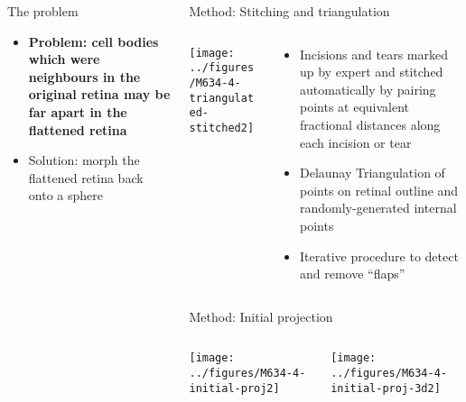 \documentclass[final,hyperref={pdfpagelabels=false}]{beamer}
\begin{document}
\begin{frame}{}
\begin{columns}[T]
\begin{column}{.33\linewidth}
\begin{block}{The problem}
        \begin{itemize}
        \item \textbf{Problem: cell bodies which were neighbours in the original
          retina may be far apart in the flattened retina}
        \item Solution: morph the flattened retina back onto a sphere
        \end{itemize}
      \end{block}

    \end{column}

    \begin{column}{.33\linewidth}

      \begin{block}{Method: Stitching and triangulation}
        \begin{columns}
          \begin{column}{0.35\linewidth}
            \texttt{[image: ../figures/M634-4-triangulated-stitched2]}            
          \end{column}
          \begin{column}{0.6\linewidth}
            \begin{itemize}
            \item Incisions and tears marked up by expert and stitched
              automatically by pairing points at equivalent fractional
              distances along each incision or tear
            \item Delaunay Triangulation of points on retinal outline and
              randomly-generated internal points
            \item Iterative procedure to detect and remove ``flaps''
            \end{itemize}
          \end{column}
        \end{columns}
      \end{block}


      \begin{block}{Method: Initial projection}
        \begin{columns}
          \begin{column}{0.35\linewidth}
            \texttt{[image: ../figures/M634-4-initial-proj2]}
          \end{column}
          \begin{column}{0.5\linewidth}
            \texttt{[image: ../figures/M634-4-initial-proj-3d2]}  


\end{column}
\end{columns}
\end{block}
\end{column}
\end{columns}
\end{frame}
\end{document}
